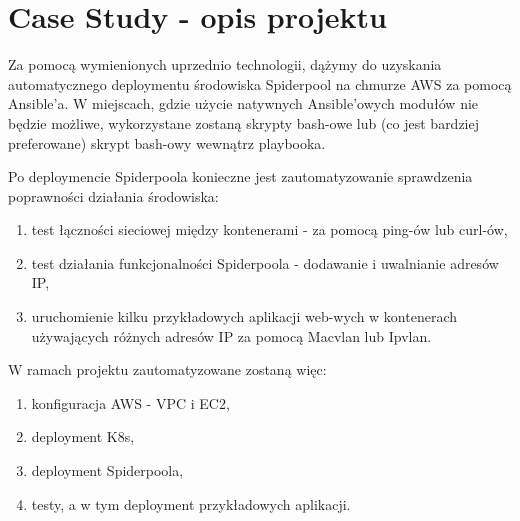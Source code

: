 \documentclass[onecolumn,12pt]{article}
\begin{document}
\section{Case Study - opis projektu}
Za pomocą wymienionych uprzednio technologii, dążymy do uzyskania automatycznego deploymentu środowiska Spiderpool na chmurze AWS za pomocą Ansible'a.
W miejscach, gdzie użycie natywnych Ansible'owych modułów nie będzie możliwe, wykorzystane zostaną skrypty bash-owe lub (co jest bardziej preferowane) skrypt bash-owy wewnątrz playbooka.

Po deploymencie Spiderpoola konieczne jest zautomatyzowanie sprawdzenia poprawności działania środowiska:
\begin{enumerate}
    \item test łączności sieciowej między kontenerami - za pomocą ping-ów lub curl-ów,
    \item test działania funkcjonalności Spiderpoola - dodawanie i uwalnianie adresów IP,
    \item uruchomienie kilku przykładowych aplikacji web-wych w kontenerach używających różnych adresów IP za pomocą Macvlan lub Ipvlan.
\end{enumerate}

W ramach projektu zautomatyzowane zostaną więc:
\begin{enumerate}
    \item konfiguracja AWS - VPC i EC2,
    \item deployment K8s,
    \item deployment Spiderpoola,
    \item testy, a w tym deployment przykładowych aplikacji.
\end{enumerate}
\end{document}
